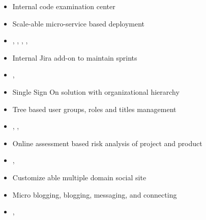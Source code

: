 \documentclass[10pt,a4paper,ragged2e]{altacv}
\begin{document}
\divider

\begin{itemize}
\item Internal code examination center
\item Scale-able micro-service based deployment
\item {}, , , , 
\end{itemize}


\clearpage



\begin{itemize}
\item Internal Jira add-on to maintain sprints
\item {}, 
\end{itemize}

\divider


\begin{itemize}
\item Single Sign On solution with organizational hierarchy
\item Tree based user groups, roles and titles management
\item {}, , 
\end{itemize}

\divider

\begin{itemize}
\item Online assessment based risk analysis of project and product
\item {}, 
\end{itemize}

\divider

\begin{itemize}
\item Customize able multiple domain social site
\item Micro blogging, blogging, messaging, and connecting
\item {}, 
\end{itemize}


\medskip


%
\end{document}

